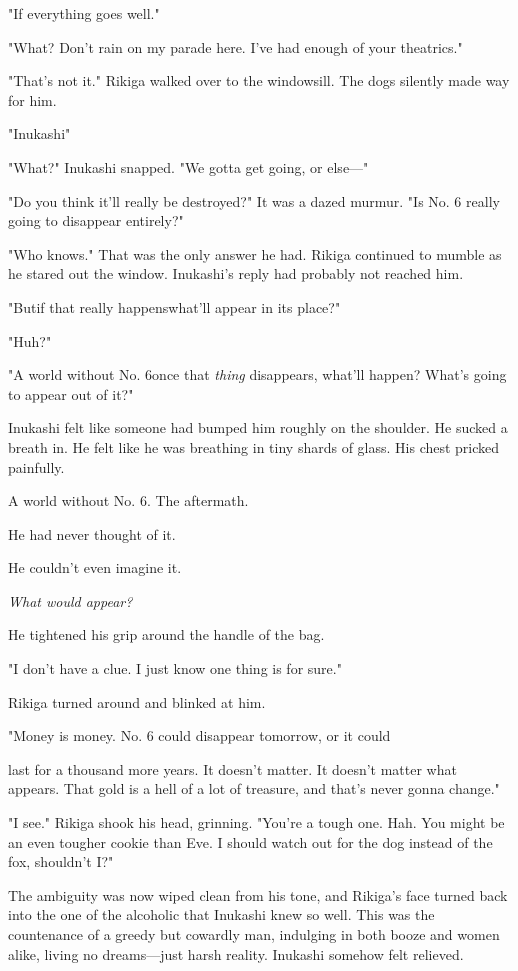 "If everything goes well."

"What? Don't rain on my parade here. I've had enough of your theatrics."

"That's not it." Rikiga walked over to the windowsill. The dogs silently
made way for him.

"Inukashi\el "

"What?" Inukashi snapped. "We gotta get going, or else---"

"Do you think it'll really be destroyed?" It was a dazed murmur. "Is No.
6 really going to disappear entirely?"

"Who knows." That was the only answer he had. Rikiga continued to mumble
as he stared out the window. Inukashi's reply had probably not reached
him.

"But\el if that really happens\el what'll appear in its place?"

"Huh?"

"A world without No. 6\el once that \emph{thing} disappears, what'll happen?
What's going to appear out of it?"

Inukashi felt like someone had bumped him roughly on the shoulder. He
sucked a breath in. He felt like he was breathing in tiny shards of
glass. His chest pricked painfully.

A world without No. 6. The aftermath.

He had never thought of it.

He couldn't even imagine it.

\emph{What would appear?}

He tightened his grip around the handle of the bag.

"I don't have a clue. I just know one thing is for sure."

Rikiga turned around and blinked at him.

"Money is money. No. 6 could disappear tomorrow, or it could~

last for a thousand more years. It doesn't matter. It doesn't matter
what appears. That gold is a hell of a lot of treasure, and that's never
gonna change."

"I see." Rikiga shook his head, grinning. "You're a tough one. Hah. You
might be an even tougher cookie than Eve. I should watch out for the dog
instead of the fox, shouldn't I?"

The ambiguity was now wiped clean from his tone, and Rikiga's face
turned back into the one of the alcoholic that Inukashi knew so well.
This was the countenance of a greedy but cowardly man, indulging in both
booze and women alike, living no dreams---just harsh reality. Inukashi
somehow felt relieved.

